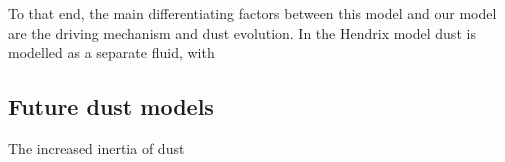 
To that end, the main differentiating factors between this model and our model are the driving mechanism and dust evolution.
In the Hendrix model dust is modelled as a separate fluid, with 


\subsection{Future dust models}


The increased inertia of dust 

